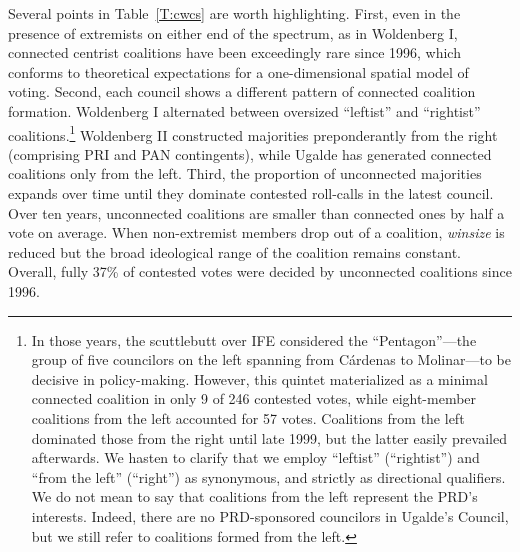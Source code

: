 \documentclass[12 pt, letter]{article}
\begin{document}
Several points in Table~\ref{T:cwcs} are worth highlighting.  First, even in the presence of extremists on either end of the spectrum, as in Woldenberg I, connected centrist coalitions have been exceedingly rare since 1996, which conforms to theoretical expectations for a one-dimensional spatial model of voting.  Second, each council shows a different pattern of connected coalition formation.  Woldenberg I alternated between oversized ``leftist'' and ``rightist'' coalitions.\footnote{In those years, the scuttlebutt over IFE considered the ``Pentagon''---the group of five councilors on the left spanning from C\'ardenas to Molinar---to be decisive in policy-making.  However, this quintet materialized as a minimal connected coalition in only 9 of 246 contested votes, while eight-member coalitions from the left accounted for 57 votes.  Coalitions from the left dominated those from the right until late 1999, but the latter easily prevailed afterwards.  We hasten to clarify that we employ ``leftist'' (``rightist'') and ``from the left'' (``right'') as synonymous, and strictly as directional qualifiers.  We do not mean to say that coalitions from the left represent the PRD's interests.  Indeed, there are no PRD-sponsored councilors in Ugalde's Council, but we still refer to coalitions formed from the left.}  Woldenberg II constructed majorities preponderantly from the right (comprising PRI and PAN contingents), while Ugalde has generated connected coalitions only from the left.  Third, the proportion of unconnected majorities expands over time until they dominate contested roll-calls in the latest council.  Over ten years, unconnected coalitions are smaller than connected ones by half a vote on average.  When non-extremist members drop out of a coalition, \emph{winsize} is reduced but the broad ideological range of the coalition remains constant.  Overall, fully 37\% of contested votes were decided by unconnected coalitions since 1996.
\end{document}

